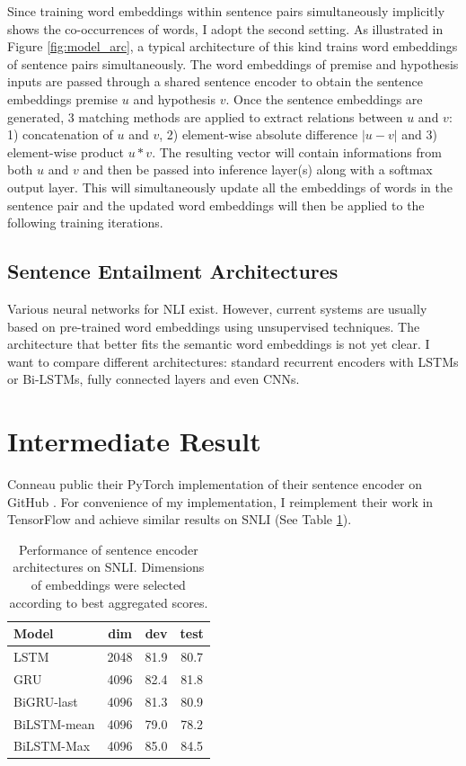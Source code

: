 \documentclass[10pt,twocolumn,letterpaper]{article}
\begin{document}
Since training word embeddings within sentence pairs simultaneously implicitly shows the co-occurrences of words, I adopt the second setting. As illustrated in Figure \ref{fig:model_arc}, a typical architecture of this kind trains word embeddings of sentence pairs simultaneously. The word embeddings of premise and hypothesis inputs are passed through a shared sentence encoder to obtain the sentence embeddings premise $u$ and hypothesis $v$. Once the sentence embeddings are generated, 3 matching methods are applied to extract relations between $u$ and $v$: 1) concatenation of $u$ and $v$, 2) element-wise absolute difference $|u - v|$ and 3) element-wise product $u*v$. The resulting vector will contain informations from both $u$ and $v$ and then be passed into inference layer(s) along with a softmax output layer. This will simultaneously update all the embeddings of words in the sentence pair and the updated word embeddings will then be applied to the following training iterations.

\subsection{Sentence Entailment Architectures}
Various neural networks for NLI exist. However, current systems are usually based on pre-trained word embeddings using unsupervised techniques. The architecture that better fits the semantic word embeddings is not yet clear. I want to compare different architectures: standard recurrent encoders with LSTMs or Bi-LSTMs, fully connected layers and even CNNs. 

\section{Intermediate Result}
Conneau \etal public their PyTorch implementation of their sentence encoder on GitHub \cite{conneau2017supervised}. For convenience of my implementation, I reimplement their work in TensorFlow and achieve similar results on SNLI (See Table \ref{tab:entail_acc}).

\begin{table}[ht]
\begin{center}
\begin{tabular}{|l|c|c|c|}\hline
Model		& dim	& dev	& test \\\hline
LSTM		& 2048	& 81.9	& 80.7 \\\hline
GRU			& 4096	& 82.4	& 81.8 \\\hline
BiGRU-last	& 4096	& 81.3	& 80.9 \\\hline
BiLSTM-mean	& 4096	& 79.0	& 78.2 \\\hline
BiLSTM-Max	& 4096	& 85.0	& 84.5 \\\hline
\end{tabular}
\end{center}
\caption{Performance of sentence encoder architectures on SNLI. Dimensions of embeddings were selected according to best aggregated scores.}
\label{tab:entail_acc}
\end{table}

{\small


}
\end{document}
